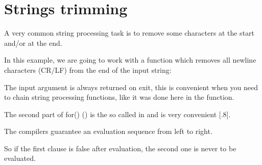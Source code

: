 \section{Strings trimming}
\newcommand{\CRLF}{\ac{CR}/\ac{LF}}

A very common string processing task is to remove some characters at the start and/or at the end.

In this example, we are going to work with a function which removes all newline characters 
(\CRLF{}) from the end of the input string:



The input argument is always returned on exit, this is convenient when you need to chain 
string processing functions, like it was done here in the \main function.

The second part of for() () is the so called  
in \CCpp and is very convenient [.8].

The \CCpp compilers guarantee an evaluation sequence from left to right.

So if the first clause is false after evaluation, the second one is never to be evaluated.






